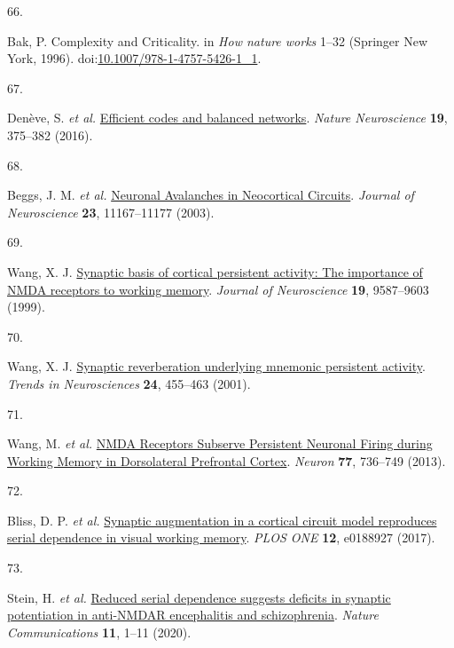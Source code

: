 \documentclass[
]{article}
\newlength{\cslhangindent}
\newlength{\csllabelwidth}
\newlength{\cslentryspacingunit} %
\newenvironment{CSLReferences}[2] %
 {%
  \setlength{\parindent}{0pt}
  \ifodd #1
  \let\oldpar\par
  \def\par{\hangindent=\cslhangindent\oldpar}
  \fi
  \setlength{\parskip}{#2\cslentryspacingunit}
 }%
 {}
\newcommand{\CSLLeftMargin}[1]{\parbox[t]{\csllabelwidth}{#1}}
\newcommand{\CSLRightInline}[1]{\parbox[t]{\linewidth - \csllabelwidth}{#1}\break}
\begin{document}
\begin{CSLReferences}{0}{0}
\leavevmode{}%
\CSLLeftMargin{66. }%
\CSLRightInline{Bak, P. {Complexity and Criticality}. in \emph{How
nature works} 1--32 (Springer New York, 1996).
doi:\href{https://doi.org/10.1007/978-1-4757-5426-1_1}{10.1007/978-1-4757-5426-1\_1}.}

\leavevmode{}%
\CSLLeftMargin{67. }%
\CSLRightInline{Denève, S. \emph{et al.}
\href{https://doi.org/10.1038/nn.4243}{{Efficient codes and balanced
networks}}. \emph{Nature Neuroscience} \textbf{19}, 375--382 (2016).}

\leavevmode{}%
\CSLLeftMargin{68. }%
\CSLRightInline{Beggs, J. M. \emph{et al.}
\href{https://doi.org/10.1523/jneurosci.23-35-11167.2003}{{Neuronal
Avalanches in Neocortical Circuits}}. \emph{Journal of Neuroscience}
\textbf{23}, 11167--11177 (2003).}

\leavevmode{}%
\CSLLeftMargin{69. }%
\CSLRightInline{Wang, X. J.
\href{https://doi.org/10.1523/jneurosci.19-21-09587.1999}{{Synaptic
basis of cortical persistent activity: The importance of NMDA receptors
to working memory}}. \emph{Journal of Neuroscience} \textbf{19},
9587--9603 (1999).}

\leavevmode{}%
\CSLLeftMargin{70. }%
\CSLRightInline{Wang, X. J.
\href{https://doi.org/10.1016/S0166-2236(00)01868-3}{{Synaptic
reverberation underlying mnemonic persistent activity}}. \emph{Trends in
Neurosciences} \textbf{24}, 455--463 (2001).}

\leavevmode{}%
\CSLLeftMargin{71. }%
\CSLRightInline{Wang, M. \emph{et al.}
\href{https://doi.org/10.1016/j.neuron.2012.12.032}{{NMDA Receptors
Subserve Persistent Neuronal Firing during Working Memory in
Dorsolateral Prefrontal Cortex}}. \emph{Neuron} \textbf{77}, 736--749
(2013).}

\leavevmode{}%
\CSLLeftMargin{72. }%
\CSLRightInline{Bliss, D. P. \emph{et al.}
\href{https://doi.org/10.1371/journal.pone.0188927}{{Synaptic
augmentation in a cortical circuit model reproduces serial dependence in
visual working memory}}. \emph{PLOS ONE} \textbf{12}, e0188927 (2017).}

\leavevmode{}%
\CSLLeftMargin{73. }%
\CSLRightInline{Stein, H. \emph{et al.}
\href{https://doi.org/10.1038/s41467-020-18033-3}{{Reduced serial
dependence suggests deficits in synaptic potentiation in anti-NMDAR
encephalitis and schizophrenia}}. \emph{Nature Communications}
\textbf{11}, 1--11 (2020).}


\end{CSLReferences}
\end{document}
